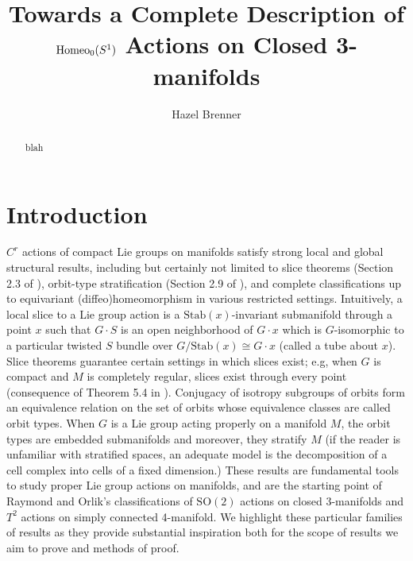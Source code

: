 \documentclass[10pt, oneside]{article}
\title{Towards a Complete Description of $\text{Homeo}_0(S^1)$ Actions on Closed 3-manifolds}
\author{Hazel Brenner}
\newcommand{\SO}[1][2]{\text{SO}(#1)}
\newcommand{\stab}[1]{\text{Stab}(#1)}
\theoremstyle{definition}
\theoremstyle{definition}
\begin{document}
\maketitle
\listoftodos
\tableofcontents
\begin{abstract}
    blah
\end{abstract}
\section{Introduction}\label{sec:intro}

$C^r$ actions of compact Lie groups on manifolds satisfy strong local and global structural results, including but certainly not limited to slice theorems (Section 2.3 of \cite{duistermaat:LieGroups}), orbit-type stratification (Section 2.9 of \cite{duistermaat:LieGroups}), and complete classifications up to equivariant (diffeo)homeomorphism in various restricted settings. Intuitively, a local slice to a Lie group action is a $\stab{x}$-invariant submanifold through a point $x$ such that $G\cdot S$ is an open neighborhood of $G\cdot x$ which is $G$-isomorphic to a particular twisted $S$ bundle over $G/\stab{x}\cong G\cdot x$ (called a tube about $x$). Slice theorems guarantee certain settings in which slices exist; e.g, when $G$ is compact and $M$ is completely regular, slices exist through every point (consequence of Theorem 5.4 in \cite{bredon:IntroductionCompact}). Conjugacy of isotropy subgroups of orbits form an equivalence relation on the set of orbits whose equivalence classes are called orbit types. When $G$ is a Lie group acting properly on a manifold $M$, the orbit types are embedded submanifolds and moreover, they stratify $M$ (if the reader is unfamiliar with stratified spaces, an adequate model is the decomposition of a cell complex into cells of a fixed dimension.) These results are fundamental tools to study proper Lie group actions on manifolds, and are the starting point of Raymond and Orlik's classifications of $\SO$ actions on closed 3-manifolds and $T^2$ actions on simply connected 4-manifold\cite{orlik:ActionsSO2,orlik:ActionsTorusI, orlik:ActionsTorusII}.
We highlight these particular families of results as they provide substantial inspiration both for the scope of results we aim to prove and methods of proof. 
\end{document}
